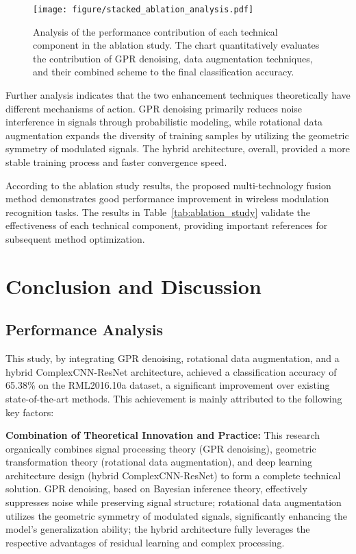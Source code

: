 \documentclass[conference]{IEEEtran}
\begin{document}
\begin{figure}[htbp]
\centering
\texttt{[image: figure/stacked\_ablation\_analysis.pdf]}
\caption{Analysis of the performance contribution of each technical component in the ablation study. The chart quantitatively evaluates the contribution of GPR denoising, data augmentation techniques, and their combined scheme to the final classification accuracy.}
\label{fig:ablation_components}
\end{figure}

Further analysis indicates that the two enhancement techniques theoretically have different mechanisms of action. GPR denoising primarily reduces noise interference in signals through probabilistic modeling, while rotational data augmentation expands the diversity of training samples by utilizing the geometric symmetry of modulated signals. The hybrid architecture, overall, provided a more stable training process and faster convergence speed.

According to the ablation study results, the proposed multi-technology fusion method demonstrates good performance improvement in wireless modulation recognition tasks. The results in Table~\ref{tab:ablation_study} validate the effectiveness of each technical component, providing important references for subsequent method optimization.

\section{Conclusion and Discussion}

\subsection{Performance Analysis}

This study, by integrating GPR denoising, rotational data augmentation, and a hybrid ComplexCNN-ResNet architecture, achieved a classification accuracy of 65.38\% on the RML2016.10a dataset, a significant improvement over existing state-of-the-art methods. This achievement is mainly attributed to the following key factors:

\textbf{Combination of Theoretical Innovation and Practice:} This research organically combines signal processing theory (GPR denoising), geometric transformation theory (rotational data augmentation), and deep learning architecture design (hybrid ComplexCNN-ResNet) to form a complete technical solution. GPR denoising, based on Bayesian inference theory, effectively suppresses noise while preserving signal structure; rotational data augmentation utilizes the geometric symmetry of modulated signals, significantly enhancing the model's generalization ability; the hybrid architecture fully leverages the respective advantages of residual learning and complex processing.
\end{document}
